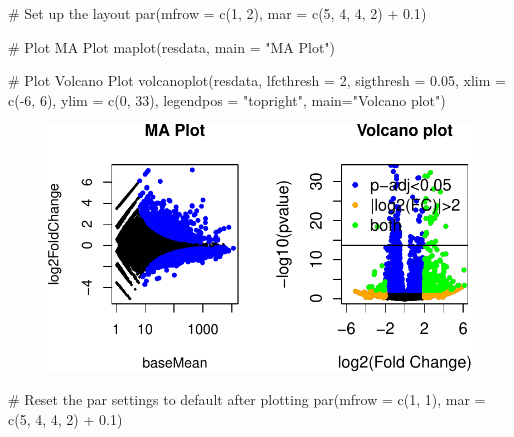 \documentclass[
  letterpaper,
  DIV=11,
  numbers=noendperiod]{scrartcl}
\newenvironment{Shaded}{\begin{snugshade}}{\end{snugshade}}
\newcommand{\AttributeTok}[1]{\textcolor[rgb]{0.40,0.45,0.13}{#1}}
\newcommand{\CommentTok}[1]{\textcolor[rgb]{0.37,0.37,0.37}{#1}}
\newcommand{\DecValTok}[1]{\textcolor[rgb]{0.68,0.00,0.00}{#1}}
\newcommand{\FloatTok}[1]{\textcolor[rgb]{0.68,0.00,0.00}{#1}}
\newcommand{\FunctionTok}[1]{\textcolor[rgb]{0.28,0.35,0.67}{#1}}
\newcommand{\NormalTok}[1]{\textcolor[rgb]{0.00,0.23,0.31}{#1}}
\newcommand{\SpecialCharTok}[1]{\textcolor[rgb]{0.37,0.37,0.37}{#1}}
\newcommand{\StringTok}[1]{\textcolor[rgb]{0.13,0.47,0.30}{#1}}
\begin{document}
\begin{Shaded}
\begin{Highlighting}[]
\CommentTok{\# Set up the layout}
\FunctionTok{par}\NormalTok{(}\AttributeTok{mfrow =} \FunctionTok{c}\NormalTok{(}\DecValTok{1}\NormalTok{, }\DecValTok{2}\NormalTok{), }\AttributeTok{mar =} \FunctionTok{c}\NormalTok{(}\DecValTok{5}\NormalTok{, }\DecValTok{4}\NormalTok{, }\DecValTok{4}\NormalTok{, }\DecValTok{2}\NormalTok{) }\SpecialCharTok{+} \FloatTok{0.1}\NormalTok{)}

\CommentTok{\# Plot MA Plot}
\FunctionTok{maplot}\NormalTok{(resdata, }\AttributeTok{main =} \StringTok{"MA Plot"}\NormalTok{)}

\CommentTok{\# Plot Volcano Plot}
\FunctionTok{volcanoplot}\NormalTok{(resdata, }\AttributeTok{lfcthresh =} \DecValTok{2}\NormalTok{, }\AttributeTok{sigthresh =} \FloatTok{0.05}\NormalTok{, }\AttributeTok{xlim =} \FunctionTok{c}\NormalTok{(}\SpecialCharTok{{-}}\DecValTok{6}\NormalTok{, }\DecValTok{6}\NormalTok{), }\AttributeTok{ylim =} \FunctionTok{c}\NormalTok{(}\DecValTok{0}\NormalTok{, }\DecValTok{33}\NormalTok{), }\AttributeTok{legendpos =} \StringTok{"topright"}\NormalTok{, }\AttributeTok{main=}\StringTok{"Volcano plot"}\NormalTok{)}
\end{Highlighting}
\end{Shaded}

\begin{figure}[H]

{\centering \includegraphics{intro-STAT-GroupProject_files/figure-pdf/unnamed-chunk-13-1.pdf}

}

\end{figure}

\begin{Shaded}
\begin{Highlighting}[]
\CommentTok{\# Reset the par settings to default after plotting}
\FunctionTok{par}\NormalTok{(}\AttributeTok{mfrow =} \FunctionTok{c}\NormalTok{(}\DecValTok{1}\NormalTok{, }\DecValTok{1}\NormalTok{), }\AttributeTok{mar =} \FunctionTok{c}\NormalTok{(}\DecValTok{5}\NormalTok{, }\DecValTok{4}\NormalTok{, }\DecValTok{4}\NormalTok{, }\DecValTok{2}\NormalTok{) }\SpecialCharTok{+} \FloatTok{0.1}\NormalTok{)}
\end{Highlighting}
\end{Shaded}
\end{document}
